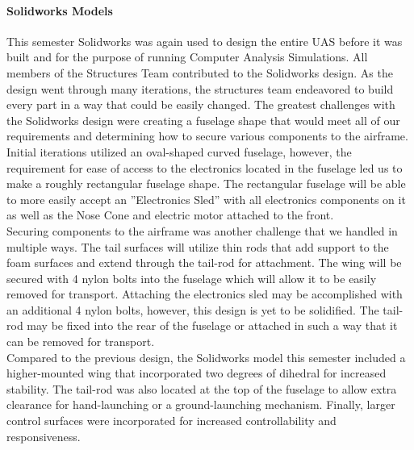 \documentclass{article}
\begin{document}
\paragraph{Solidworks Models}
This semester Solidworks was again used to design the entire UAS before it was built and for the purpose of running Computer Analysis Simulations. All members of the Structures Team contributed to the Solidworks design. As the design went through many iterations, the structures team endeavored to build every part in a way that could be easily changed. The greatest challenges with the Solidworks design were creating a fuselage shape that would meet all of our requirements and determining how to secure various components to the airframe. Initial iterations utilized an oval-shaped curved fuselage, however, the requirement for ease of access to the electronics located in the fuselage led us to make a roughly rectangular fuselage shape. The rectangular fuselage will be able to more easily accept an ''Electronics Sled'' with all electronics components on it as well as the Nose Cone and electric motor attached to the front.\\

Securing components to the airframe was another challenge that we handled in multiple ways. The tail surfaces will utilize thin rods that add support to the foam surfaces and extend through the tail-rod for attachment. The wing will be secured with 4 nylon bolts into the fuselage which will allow it to be easily removed for transport. Attaching the electronics sled may be accomplished with an additional 4 nylon bolts, however, this design is yet to be solidified. The tail-rod may be fixed into the rear of the fuselage or attached in such a way that it can be removed for transport.\\

Compared to the previous design, the Solidworks model this semester included a higher-mounted wing that incorporated two degrees of dihedral for increased stability. The tail-rod was also located at the top of the fuselage to allow extra clearance for hand-launching or a ground-launching mechanism. Finally, larger control surfaces were incorporated for increased controllability and responsiveness.\\
\end{document}
